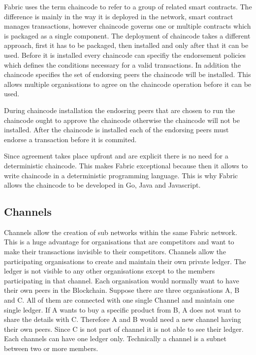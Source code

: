 Fabric uses the term chaincode to refer to a group of related smart contracts. The difference is mainly in the way it is deployed in the network, smart contract manages transactions, however chaincode governs one or multiple contracts which is packaged as a single component. The deployment of chaincode takes a different approach, first it has to be packaged, then installed and only after that it can be used. Before it is installed every chaincode can specifiy the endorsement policies which defines the conditions necessary for a valid transactions. In addition the chaincode specifies the set of  endorsing peers the chaincode will be installed. This allows multiple organisations to agree on the chaincode operation before it can be used. 


During chaincode installation the endosring peers that are chosen to run the chaincode ought to approve the chaincode otherwise the chaincode will not be installed. After the chaincode is installed each of the endorsing peers must endorse a transaction before it is commited. 



Since agreement takes place upfront and are explicit there is no need for a deterministic chaincode. This makes Fabric exceptional because then it allows to write chaincode in a deterministic programming language. This is why Fabric allows the chaincode to be developed in Go, Java and Javascript. 




\subsection{Channels}

Channels allow the creation of sub networks within the same Fabric network. This is a huge advantage for organisations that are competitors and want to make their transactions invisible to their competitors. Channels allow the participating organisations to create and maintain their own private ledger. The ledger is not visible to any other organisations except to the members participating in that channel. 
Each organisation would normally want to have their own peers in the Blockchain. Suppose there are three organisations A, B and C. All of them are connected with one single Channel and maintain one single ledger. If A wants to buy a specific product from B, A does not want to share the details with C. Therefore A and B would need a new channel having their own peers. Since C is not part of channel it is not able to see their ledger. Each channels can have one ledger only. 
Technically a channel is a subnet between two or more members.  

